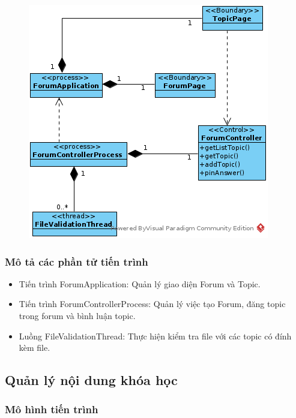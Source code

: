 \documentclass[./../main_file.tex]{subfiles}
\begin{document}
\begin{figure}[H]
	\centering
	\includegraphics[width=\linewidth]{./images/pv_manage_forum.png}
\end{figure}

\subsubsection{Mô tả các phần tử tiến trình}
\begin{itemize}
	\item Tiến trình ForumApplication: Quản lý giao diện Forum và Topic.
	\item Tiến trình ForumControllerProcess: Quản lý việc tạo Forum, đăng topic trong forum và bình luận topic.
	\item Luồng FileValidationThread: Thực hiện kiểm tra file với các topic có đính kèm file.
\end{itemize}

\subsection{Quản lý nội dung khóa học}

\subsubsection{Mô hình tiến trình}
\end{document}
